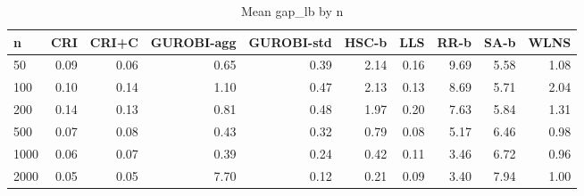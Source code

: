 \begin{table}[htbp]
\centering
\small
\caption{Mean gap\_lb by n}
\label{tab:E4b_equal_budgets_60s_b60_by_n}
\begin{tabular}{lrrrrrrrrr}
\toprule
n & CRI & CRI+C & GUROBI-agg & GUROBI-std & HSC-b & LLS & RR-b & SA-b & WLNS \\
\midrule
50 & 0.09 & 0.06 & 0.65 & 0.39 & 2.14 & 0.16 & 9.69 & 5.58 & 1.08 \\
100 & 0.10 & 0.14 & 1.10 & 0.47 & 2.13 & 0.13 & 8.69 & 5.71 & 2.04 \\
200 & 0.14 & 0.13 & 0.81 & 0.48 & 1.97 & 0.20 & 7.63 & 5.84 & 1.31 \\
500 & 0.07 & 0.08 & 0.43 & 0.32 & 0.79 & 0.08 & 5.17 & 6.46 & 0.98 \\
1000 & 0.06 & 0.07 & 0.39 & 0.24 & 0.42 & 0.11 & 3.46 & 6.72 & 0.96 \\
2000 & 0.05 & 0.05 & 7.70 & 0.12 & 0.21 & 0.09 & 3.40 & 7.94 & 1.00 \\
\bottomrule
\end{tabular}
\end{table}
